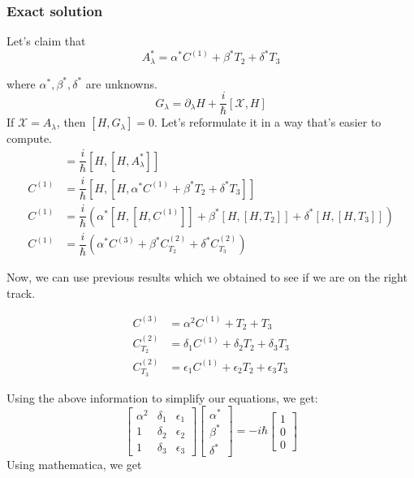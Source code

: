 \documentclass[11pt,a4paper]{article}
\begin{document}
\subsubsection{Exact solution}


Let's claim that 
\begin{equation}
 A_{\lambda}^*= \alpha^* C^{(1)} +  \beta^* T_2 + \delta^* T_3 
\end{equation}

where $\alpha^*, \beta^*, \delta^* $ are unknowns. 
\begin{equation}
G_{\lambda}= \partial_{\lambda} H + \dfrac{i}{\hbar} [\mathcal{X}, H] 
\end{equation}
If $\mathcal{X}= A_{\lambda}$, then $[H,G_{\lambda}]=0 $. Let's reformulate it in a way that's easier to compute. 
\begin{align}
[H,\partial_{\lambda} H ] &= \dfrac{i}{\hbar} [H,[H, A_{\lambda}^*]] \\
C^{(1)} &= \dfrac{i}{\hbar} [H,[H,\alpha^* C^{(1)} +  \beta^* T_2 + \delta^* T_3 ]] \\
C^{(1)} &= \dfrac{i}{\hbar} \left (\alpha^* [H,[H, C^{(1)}]]  +  \beta^* [H,[H,  T_2 ]]+  \delta^* [H,[H,  T_3]]  \right)  \\
C^{(1)} &= \dfrac{i}{\hbar} \left (\alpha^* C^{(3)}   + \beta^*   C^{(2)}_{T_2} + \delta^* C^{(2)}_{T_3} \right)
\end{align}

Now, we can use previous results which we obtained to see if we are on the right track.

\begin{align*}
C^{(3)} &=   \alpha^2  C^{(1)}  +T_2  +T_3 \\
C^{(2)}_{T_2}&= \delta_1 C^{(1)} + \delta_2 T_2 + \delta_3 T_3 \\
C^{(2)}_{T_3}&= \epsilon_1 C^{(1)} + \epsilon_2 T_2 + \epsilon_3 T_3 
\end{align*}

Using the above information to simplify our equations, we get:
\begin{equation}
\begin{bmatrix}
    \alpha^2       & \delta_{1} & \epsilon_{1} \\
    1     & \delta_{2} & \epsilon_{2} \\
    1      & \delta_{3} & \epsilon_{3}
\end{bmatrix}
\begin{bmatrix}
\alpha^* \\
\beta^* \\
\delta^*   
   \end{bmatrix}
=
- i \hbar \begin{bmatrix}
1 \\
0 \\
0   
   \end{bmatrix}
\end{equation}
Using mathematica, we get 
\end{document}
